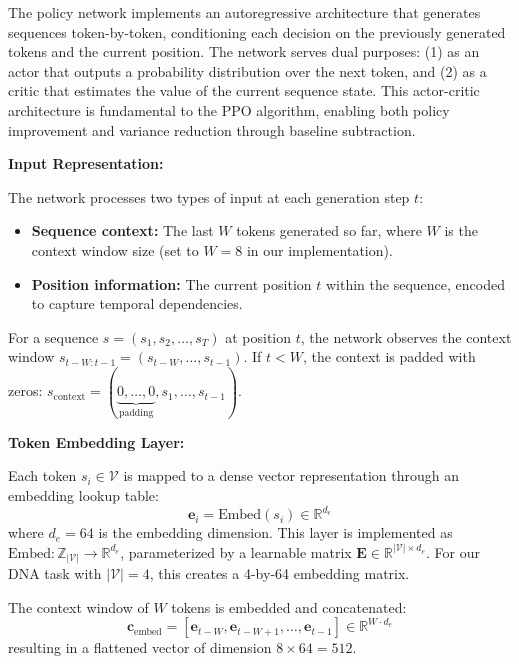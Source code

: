 \documentclass[conference]{IEEEtran}
\begin{document}
The policy network implements an autoregressive architecture that generates sequences token-by-token, conditioning each decision on the previously generated tokens and the current position. The network serves dual purposes: (1) as an actor that outputs a probability distribution over the next token, and (2) as a critic that estimates the value of the current sequence state. This actor-critic architecture is fundamental to the PPO algorithm, enabling both policy improvement and variance reduction through baseline subtraction.

\textbf{Input Representation:}

The network processes two types of input at each generation step $t$:
\begin{itemize}
    \item \textbf{Sequence context:} The last $W$ tokens generated so far, where $W$ is the context window size (set to $W = 8$ in our implementation).
    \item \textbf{Position information:} The current position $t$ within the sequence, encoded to capture temporal dependencies.
\end{itemize}

For a sequence $s = (s_1, s_2, \ldots, s_T)$ at position $t$, the network observes the context window $s_{t-W:t-1} = (s_{t-W}, \ldots, s_{t-1})$. If $t < W$, the context is padded with zeros: $s_{\text{context}} = (\underbrace{0, \ldots, 0}_{\text{padding}}, s_1, \ldots, s_{t-1})$.

\textbf{Token Embedding Layer:}

Each token $s_i \in \mathcal{V}$ is mapped to a dense vector representation through an embedding lookup table:
\begin{equation}
\mathbf{e}_i = \text{Embed}(s_i) \in \mathbb{R}^{d_e}
\end{equation}
where $d_e = 64$ is the embedding dimension. This layer is implemented as $\text{Embed}: \mathbb{Z}_{|\mathcal{V}|} \rightarrow \mathbb{R}^{d_e}$, parameterized by a learnable matrix $\mathbf{E} \in \mathbb{R}^{|\mathcal{V}| \times d_e}$. For our DNA task with $|\mathcal{V}| = 4$, this creates a 4-by-64 embedding matrix.

The context window of $W$ tokens is embedded and concatenated:
\begin{equation}
\mathbf{c}_{\text{embed}} = [\mathbf{e}_{t-W}, \mathbf{e}_{t-W+1}, \ldots, \mathbf{e}_{t-1}] \in \mathbb{R}^{W \cdot d_e}
\end{equation}
resulting in a flattened vector of dimension $8 \times 64 = 512$.
\end{document}
